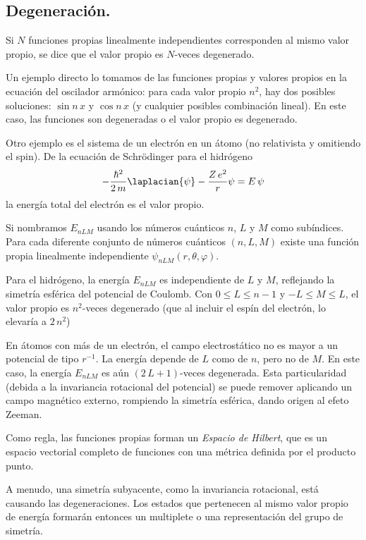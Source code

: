 \subsection{Degeneración.}
Si $N$ funciones propias linealmente independientes corresponden al mismo valor propio, se dice que el valor propio es $N$-veces degenerado.
\par
Un ejemplo directo lo tomamos de las funciones propias y valores propios en la ecuación del oscilador armónico: para cada valor propio $n^{2}$, hay dos posibles soluciones: $\sin n \, x$ y $\cos n \, x$ (y cualquier posibles combinación lineal). En este caso, las funciones son degeneradas o el valor propio es degenerado.
\par
Otro ejemplo es el sistema de un electrón en un átomo (no relativista y omitiendo el spin). De la ecuación de Schrödinger para el hidrógeno
\begin{align*}
- \dfrac{\hbar^{2}}{2 \, m} \laplacian{\psi} - \dfrac{Z \, e^{2}}{r} \psi =  E \, \psi
\end{align*}
la energía total del electrón es el valor propio.
\par
Si nombramos $E_{nLM}$ usando los números cuánticos $n$, $L$ y $M$ como subíndices. Para cada diferente conjunto de números cuánticos $(n, L, M)$ existe una función propia linealmente independiente $\psi_{nLM}(r,\theta, \varphi)$.
\par
Para el hidrógeno, la energía $E_{nLM}$ es independiente de $L$ y $M$, reflejando la simetría esférica del potencial de Coulomb. Con $0 \leq L \leq n-1$ y $-L \leq M \leq L$, el valor propio es $n^{2}$-veces degenerado (que al incluir el espín del electrón, lo elevaría a $2 \, n^{2}$)
\par
En átomos con más de un electrón, el campo electrostático no es mayor a un potencial de tipo $r^{-1}$. La energía depende de $L$ como de $n$, pero no de $M$. En este caso, la energía $E_{nLM}$ es aún $(2 \, L + 1)$-veces degenerada. Esta particularidad (debida a la invariancia rotacional del potencial) se puede remover aplicando un campo magnético externo, rompiendo la simetría esférica, dando origen al efeto Zeeman.
\par
Como regla, las funciones propias forman un \emph{Espacio de Hilbert}, que es un espacio vectorial completo de funciones con una métrica definida por el producto punto.
\par
A menudo, una simetría subyacente, como la invariancia rotacional, está causando las degeneraciones. Los estados que pertenecen al mismo valor propio de energía formarán entonces un multiplete o una representación del grupo de simetría.
\newpage
